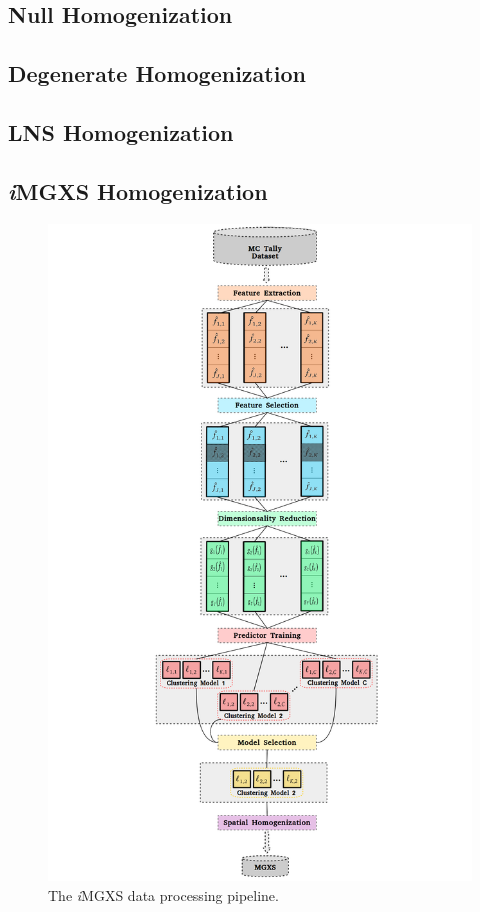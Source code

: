 \documentclass[12pt,twoside]{mitthesis-exec}
\begin{document}
\subsection*{Null Homogenization}

\subsection*{Degenerate Homogenization}

\subsection*{LNS Homogenization}

\subsection*{\textit{i}MGXS Homogenization}

\begin{figure}[h!]
\centering
\includegraphics[width=0.9\linewidth]{figures/unsupervised/features/engineering/flow-chart}
\vspace{2mm}
\caption[\textit{i}MGXS flow chart]{The \textit{i}MGXS data processing pipeline.}
\label{fig:imgxs-flow-chart}
\end{figure}
\end{document}
